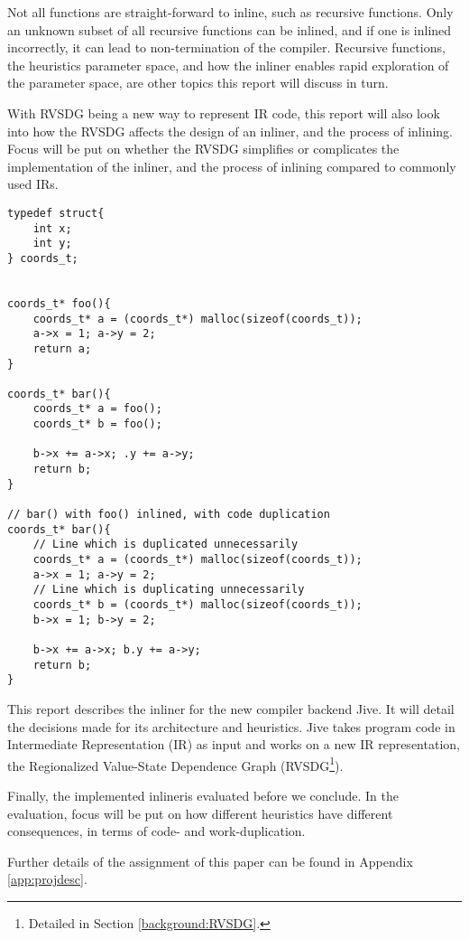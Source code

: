 Not all functions are straight-forward to inline, such as recursive functions.
Only an unknown subset of all recursive functions can be inlined, and if one is
inlined incorrectly, it can lead to non-termination of the compiler. Recursive
functions, the heuristics parameter space, and how the inliner enables rapid
exploration of the parameter space, are other topics this report will discuss in
turn.

With RVSDG being a new way to represent IR code, this report will also look into
how the RVSDG affects the design of an inliner, and the process of inlining.
Focus will be put on whether the RVSDG simplifies or complicates the
implementation of the inliner, and the process of inlining compared to commonly
used IRs.

\begin{lstlisting}[label={lst:code-dup}, style=customcpp,
caption={Code duplication in \textit{bar()}, when inlining \textit{foo()} into
\textit{bar()}.}]
typedef struct{
	int x;
	int y;
} coords_t;


coords_t* foo(){
	coords_t* a = (coords_t*) malloc(sizeof(coords_t));
	a->x = 1; a->y = 2;
	return a;
}

coords_t* bar(){
	coords_t* a = foo();
	coords_t* b = foo();

	b->x += a->x; .y += a->y;
	return b;
}

// bar() with foo() inlined, with code duplication
coords_t* bar(){
	// Line which is duplicated unnecessarily
	coords_t* a = (coords_t*) malloc(sizeof(coords_t));
	a->x = 1; a->y = 2;
	// Line which is duplicating unnecessarily
	coords_t* b = (coords_t*) malloc(sizeof(coords_t));
	b->x = 1; b->y = 2;

	b->x += a->x; b.y += a->y;
	return b;
}
\end{lstlisting}


This report describes the inliner for the new compiler backend Jive. It will
detail the decisions made for its architecture and heuristics. Jive takes
program code in Intermediate Representation (IR) as input and works on a new IR
representation, the Regionalized Value-State Dependence Graph
(RVSDG\footnote{Detailed in Section \ref{background:RVSDG}.}).

Finally, the implemented inlineris evaluated before we conclude. In the
evaluation, focus will be put on how different heuristics have different
consequences, in terms of code- and work-duplication.

Further details of the assignment of this paper can be found in Appendix
\ref{app:projdesc}.
